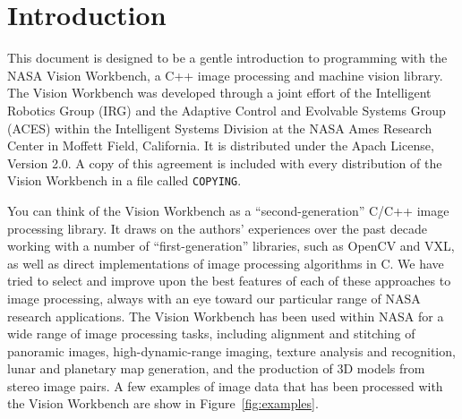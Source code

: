 \chapter{Introduction}

This document is designed to be a gentle introduction to programming
with the NASA Vision Workbench, a C++ image processing and machine
vision library.  The Vision Workbench was developed through a joint
effort of the Intelligent Robotics Group (IRG) and the Adaptive
Control and Evolvable Systems Group (ACES) within the Intelligent
Systems Division at the NASA Ames Research Center in Moffett Field,
California.  It is distributed under the Apach License, Version 2.0.
A copy of this agreement is included with every distribution of the
Vision Workbench in a file called {\tt COPYING}.

You can think of the Vision Workbench as a ``second-generation'' C/C++
image processing library.  It draws on the authors' experiences over
the past decade working with a number of ``first-generation''
libraries, such as OpenCV and VXL, as well as direct implementations
of image processing algorithms in C.  We have tried to select and
improve upon the best features of each of these approaches to image
processing, always with an eye toward our particular range of NASA
research applications.  The Vision Workbench has been used within NASA
for a wide range of image processing tasks, including alignment and
stitching of panoramic images, high-dynamic-range imaging, texture
analysis and recognition, lunar and planetary map generation, and the
production of 3D models from stereo image pairs.  A few examples of
image data that has been processed with the Vision Workbench are show
in Figure~\ref{fig:examples}.

